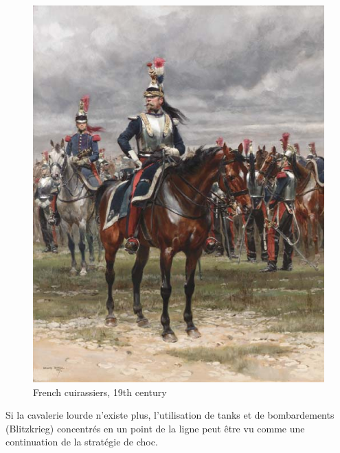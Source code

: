 \documentclass{article}
\begin{document}
\begin{center}
\begin{figure}[H]
\hfill
\begin{minipage}[H]{0.45\linewidth}
	\centering
	\includegraphics[width=\linewidth]{../ressources/cuirassiers}
	\caption{French cuirassiers, 19th century \cite{heavy_cavalry}}
\end{minipage}
\hfill
\end{figure}
\end{center}
Si la cavalerie lourde n'existe plus, l'utilisation de tanks et de bombardements (Blitzkrieg) concentrés en un point de la ligne peut être vu comme une continuation de la stratégie de choc.
\end{document}
